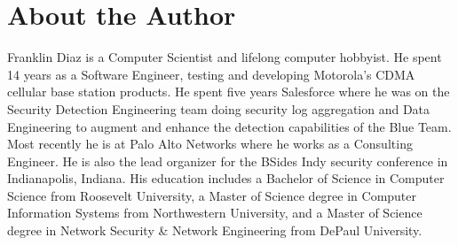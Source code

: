 \chapter*{About the Author}
\vspace{5mm}

\justify
Franklin Diaz is a Computer Scientist and lifelong computer hobbyist. He spent
14 years as a Software Engineer, testing and developing Motorola's CDMA
cellular base station products. He spent five years Salesforce where he was on the Security Detection Engineering team doing security log aggregation and Data Engineering to augment and enhance the detection capabilities of the Blue Team. Most recently he is at Palo Alto Networks where he works as a Consulting Engineer. He is also the lead organizer for the BSides Indy security conference in Indianapolis, Indiana. His education includes a Bachelor of Science in Computer Science from Roosevelt University, a Master of Science degree in Computer Information Systems from Northwestern University, and a Master of Science degree in Network Security \& Network Engineering from DePaul University.
\vspace{5mm}
